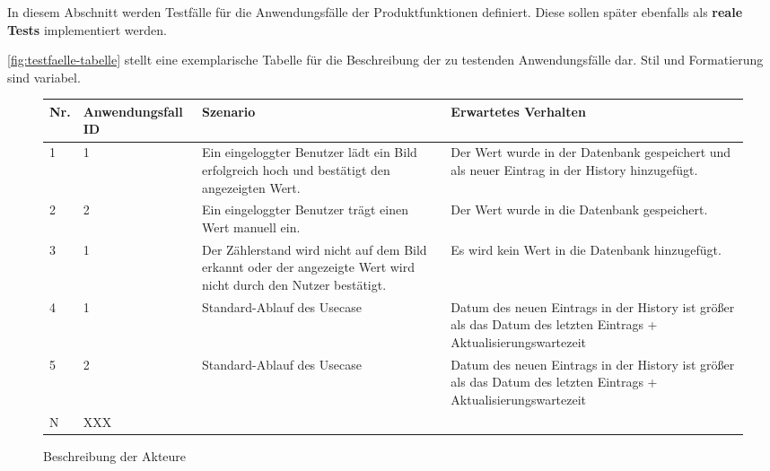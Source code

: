 \begin{tcolorbox}
	In diesem Abschnitt werden Testfälle für die Anwendungsfälle der Produktfunktionen definiert.
	Diese sollen später ebenfalls als \textbf{reale Tests} implementiert werden.
	
	\autoref{fig:testfaelle-tabelle} stellt eine exemplarische Tabelle für die Beschreibung der zu testenden Anwendungsfälle dar. 
	Stil und Formatierung sind variabel.
	\end{tcolorbox}
	
	\begin{figure}[!h]
		\begin{center}
			\begin{tabularx}{\textwidth}{ p{} | p{} | p{} | X }
				\textbf{Nr.} & \textbf{Anwendungsfall ID} & \textbf{Szenario} & \textbf{Erwartetes Verhalten} \\ \hline
				1 & 1 & Ein eingeloggter Benutzer lädt ein Bild erfolgreich hoch und bestätigt den angezeigten Wert. & Der Wert wurde in der Datenbank gespeichert und als neuer Eintrag in der History hinzugefügt.    \\ \hline
				2 & 2 & Ein eingeloggter Benutzer trägt einen Wert manuell ein. & Der Wert wurde in die Datenbank gespeichert. \\ \hline
				3 & 1 & Der Zählerstand wird nicht auf dem Bild erkannt oder der angezeigte Wert wird nicht durch den Nutzer bestätigt. & Es wird kein Wert in die Datenbank hinzugefügt. \\ \hline
				4 & 1 & Standard-Ablauf des Usecase  & Datum des neuen Eintrags in der History ist größer als das Datum des letzten Eintrags + Aktualisierungswartezeit \\ \hline
				5 & 2 & Standard-Ablauf des Usecase  & Datum des neuen Eintrags in der History ist größer als das Datum des letzten Eintrags + Aktualisierungswartezeit \\ \hline
				N & XXX &  &  \\ \hline
			\end{tabularx}	
		\end{center}
		\caption{Beschreibung der Akteure}
		\label{fig:testfaelle-tabelle}
	\end{figure}
	